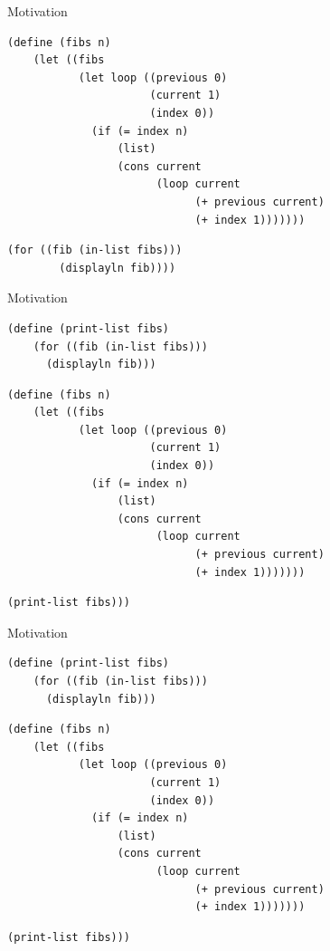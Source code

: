 \documentclass[xcolor=dvipsnames, 14pt]{beamer}
\begin{document}
\begin{frame}[fragile]{Motivation}
\begin{Verbatim}[fontsize=\footnotesize]
  (define (fibs n)
    (let ((fibs
           (let loop ((previous 0)
                      (current 1)
                      (index 0))
             (if (= index n)
                 (list)
                 (cons current
                       (loop current
                             (+ previous current)
                             (+ index 1)))))))
\end{Verbatim}
\begin{Verbatim}[frame=single, rulecolor=\color{red}, fontsize=\footnotesize]
      (for ((fib (in-list fibs)))
        (displayln fib))))
\end{Verbatim}
\end{frame}
\begin{frame}[fragile]{Motivation}

\begin{Verbatim}[frame=single, rulecolor=\color{red}, fontsize=\footnotesize]
  (define (print-list fibs)
    (for ((fib (in-list fibs)))
      (displayln fib)))
\end{Verbatim}
\begin{Verbatim}[fontsize=\footnotesize]
  (define (fibs n)
    (let ((fibs
           (let loop ((previous 0)
                      (current 1)
                      (index 0))
             (if (= index n)
                 (list)
                 (cons current
                       (loop current
                             (+ previous current)
                             (+ index 1)))))))
\end{Verbatim}
\begin{Verbatim}[frame=single, rulecolor=\color{red}, fontsize=\footnotesize]
      (print-list fibs)))
\end{Verbatim}
\end{frame}
\begin{frame}[fragile]{Motivation}
\begin{Verbatim}[fontsize=\footnotesize]
  (define (print-list fibs)
    (for ((fib (in-list fibs)))
      (displayln fib)))
\end{Verbatim}
\begin{Verbatim}[frame=single, rulecolor=\color{red},fontsize=\footnotesize]
  (define (fibs n)
    (let ((fibs
           (let loop ((previous 0)
                      (current 1)
                      (index 0))
             (if (= index n)
                 (list)
                 (cons current
                       (loop current
                             (+ previous current)
                             (+ index 1)))))))
\end{Verbatim}
\begin{Verbatim}[fontsize=\footnotesize]
      (print-list fibs)))
\end{Verbatim}
\end{frame}
\end{document}
